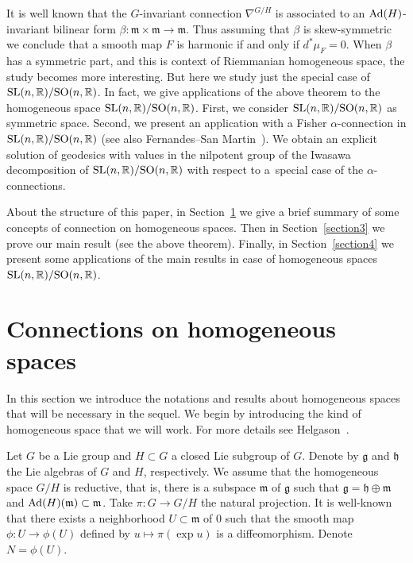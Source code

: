 \documentclass[pdftex]{sigma}
\numberwithin{equation}{section}
\newcommand{\m}{\mathfrak{m}}
\begin{document}
It is well known that the $G$-invariant connection $\nabla^{G/H}$ is
associated to an ${\rm Ad}(H)$-invariant bilinear form $\beta\colon \m
\times \m \rightarrow \m$. Thus assuming that $\beta$ is
skew-symmetric we conclude that a smooth map $F$ is harmonic if and
only if $d^{*}\mu_{F} = 0$. When $\beta$ has a symmetric part, and
this is context of Riemmanian homogeneous space, the study becomes
more interesting. But here we study just the special case of ${\rm
SL}(n, {\mathbb R})/{\rm SO}(n,\mathbb{R})$. In fact, we give
applications of the above theorem to the homogeneous space ${\rm
SL}(n, {\mathbb R})/{\rm SO}(n,\mathbb{R})$. First, we consider ${\rm
SL}(n, {\mathbb R})/{\rm SO}(n,\mathbb{R})$ as symmetric space. Second,
we present an application with a Fisher $\alpha$-connection in ${\rm
SL}(n, {\mathbb R})/{\rm SO}(n,\mathbb{R})$ (see also Fernandes--San
Martin~\cite{FernandesM/San-MartinL,FernandesM/San-MartinL2}). We obtain an explicit solution of
geodesics with values in the nilpotent group of the Iwasawa
decomposition of ${\rm SL}(n, {\mathbb R})/{\rm SO}(n,\mathbb{R})$ with
respect to a~special case of the $\alpha$-connections.



About the structure of this paper, in Section~\ref{section2} we give a brief summary of some concepts of connection on homogeneous spaces. Then in Section~\ref{section3} we prove our main result (see the above theorem). Finally, in Section~\ref{section4} we present some applications of the main results in case of homogeneous spaces~${\rm SL}(n, {\mathbb R})/{\rm SO}(n,\mathbb{R})$.

\section{Connections on homogeneous spaces}\label{section2}

In this section we introduce the notations and results about
homogeneous spaces that will be necessary in the sequel. We begin by
introducing the kind of homogeneous space that we will work. For
more details see Helgason~\cite{Helgason}.

Let $G$ be a Lie group and $H\subset G$ a closed Lie subgroup of $G$. Denote by $\mathfrak{g}$ and $\mathfrak{h}$ the Lie algebras of $G$ and $H$, respectively. We assume that the homogeneous space $G/H$ is reductive, that is, there is a subspace $\mathfrak{m}$ of $\mathfrak{g}$ such that $\mathfrak{g} = \mathfrak{h} \oplus \mathfrak{m}$ and ${\rm Ad}(H)(\m)\subset \m$. Take $\pi \colon G \rightarrow G/H$ the natural projection. It is well-known that there exists a neighborhood $U \subset \m$ of $0$ such that the smooth map $\phi\colon U \rightarrow \phi(U)$ def\/ined by $u \mapsto \pi(\exp u)$ is a dif\/feomorphism. Denote $N = \phi (U)$.
\end{document}
